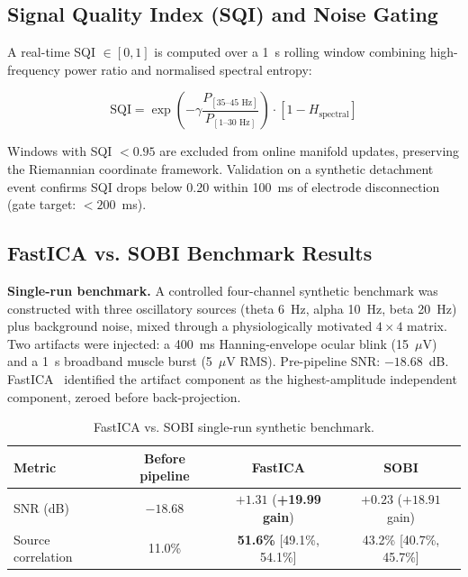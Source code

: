 \documentclass[11pt]{article}
\begin{document}
\subsection{Signal Quality Index (SQI) and Noise Gating}

A real-time SQI $\in [0, 1]$ is computed over a 1~s rolling window combining high-frequency power ratio and normalised spectral entropy:

\begin{equation}
\text{SQI} = \exp\!\left( -\gamma \frac{P_{[35\text{--}45\text{ Hz}]}}{P_{[1\text{--}30\text{ Hz}]}} \right) \cdot \left[1 - H_\text{spectral}\right]
\end{equation}

Windows with SQI $< 0.95$ are excluded from online manifold updates, preserving the Riemannian coordinate framework. Validation on a synthetic detachment event confirms SQI drops below 0.20 within 100~ms of electrode disconnection (gate target: $<200$~ms).

\subsection{FastICA vs. SOBI Benchmark Results}

\textbf{Single-run benchmark.} A controlled four-channel synthetic benchmark was constructed with three oscillatory sources (theta 6~Hz, alpha 10~Hz, beta 20~Hz) plus background noise, mixed through a physiologically motivated $4\times4$ matrix. Two artifacts were injected: a 400~ms Hanning-envelope ocular blink (15~$\mu$V) and a 1~s broadband muscle burst (5~$\mu$V RMS). Pre-pipeline SNR: $-18.68$~dB. FastICA~\cite{hyvarinen2000} identified the artifact component as the highest-amplitude independent component, zeroed before back-projection.

\begin{table}[htbp]
\centering
\small
\caption{FastICA vs. SOBI single-run synthetic benchmark.}
\begin{tabular}{lccc}
\toprule
Metric & Before pipeline & FastICA & SOBI \\
\midrule
SNR (dB) & $-18.68$ & $+1.31$ (\textbf{+19.99 gain}) & $+0.23$ ($+18.91$ gain) \\
Source correlation & 11.0\% & \textbf{51.6\%} [49.1\%, 54.1\%] & 43.2\% [40.7\%, 45.7\%] \\
\bottomrule
\end{tabular}

\end{table}
\end{document}
